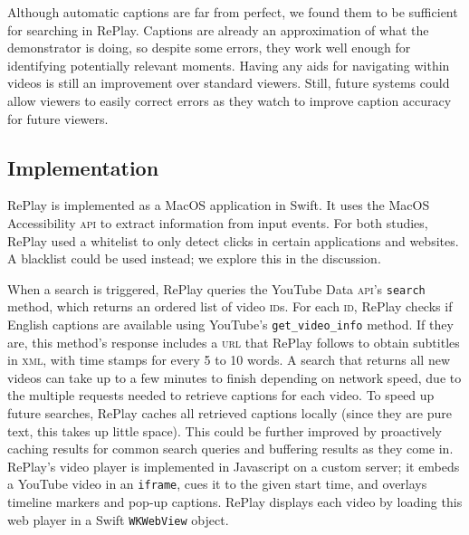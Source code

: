Although automatic captions are far from perfect, we found them to be sufficient for searching in RePlay. Captions are already an approximation of what the demonstrator is doing, so despite some errors, they work well enough for identifying potentially relevant moments. Having any aids for navigating within videos is still an improvement over standard viewers. Still, future systems could allow viewers to easily correct errors as they watch to improve caption accuracy for future viewers.

\subsection{Implementation}
RePlay is implemented as a Mac\-OS application in Swift. It uses the Mac\-OS Accessibility \textsc{api} to extract information from input events. For both studies, RePlay used a whitelist to only detect clicks in certain applications and websites. A blacklist could be used instead; we explore this in the discussion.

When a search is triggered, RePlay queries the YouTube Data \textsc{api}'s \texttt{search} method, which returns an ordered list of video \textsc{id}s. For each \textsc{id}, RePlay checks if English captions are available using YouTube's \texttt{get\_video\_info} method. If they are, this method's response includes a \textsc{url} that RePlay follows to obtain subtitles in \textsc{xml}, with time stamps for every 5 to 10 words. A search that returns all new videos can take up to a few minutes to finish depending on network speed, due to the multiple requests needed to retrieve captions for each video. To speed up future searches, RePlay caches all retrieved captions locally (since they are pure text, this takes up little space). This could be further improved by proactively caching results for common search queries and buffering results as they come in. RePlay's video player is implemented in Javascript on a custom server; it embeds a YouTube video in an \texttt{iframe}, cues it to the given start time, and overlays timeline markers and pop-up captions. RePlay displays each video by loading this web player in a Swift \texttt{WKWebView} object. 